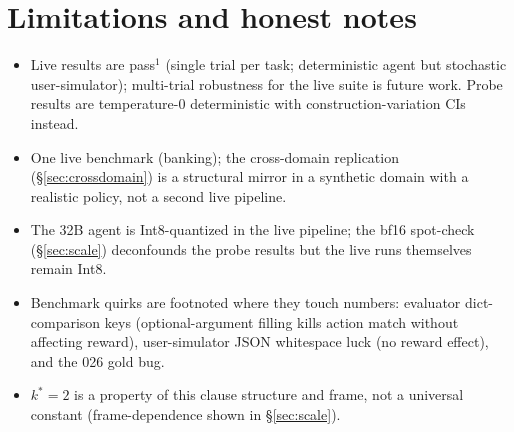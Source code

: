 \section{Limitations and honest notes}
\label{sec:limitations}

\begin{itemize}
\item Live results are pass$^1$ (single trial per task; deterministic agent but stochastic user-simulator);
  multi-trial robustness for the live suite is future work. Probe results are temperature-0 deterministic with
  construction-variation CIs instead.
\item One live benchmark (banking); the cross-domain replication (\S\ref{sec:crossdomain}) is a structural
  mirror in a synthetic domain with a realistic policy, not a second live pipeline.
\item The 32B agent is Int8-quantized in the live pipeline; the bf16 spot-check (\S\ref{sec:scale})
  deconfounds the probe results but the live runs themselves remain Int8.
\item Benchmark quirks are footnoted where they touch numbers: evaluator dict-comparison keys
  (optional-argument filling kills action match without affecting reward), user-simulator JSON whitespace luck
  (no reward effect), and the 026 gold bug.
\item $k^\ast{=}2$ is a property of this clause structure and frame, not a universal constant
  (frame-dependence shown in \S\ref{sec:scale}).
\end{itemize}
